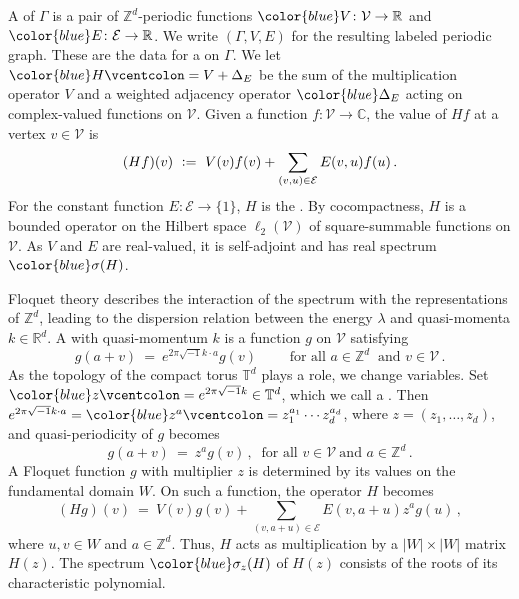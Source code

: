 \documentclass[12pt]{amsart}
\theoremstyle{remark}
\newcommand{\CC}{{\mathbb C}}
\newcommand{\RR}{{\mathbb R}}
\newcommand{\TT}{{\mathbb T}}
\newcommand{\ZZ}{{\mathbb Z}}
\newcommand{\calE}{{\mathcal E}}
\newcommand{\calV}{{\mathcal V}}
\newcommand{\defcolor}[1]{{\color{blue}#1}}
\newcommand{\demph}[1]{\defcolor{{\sl #1}}}
\begin{document}
A \demph{labeling} of $\Gamma$ is a pair of  $\ZZ^d$-periodic functions
$\defcolor{V}\colon \calV \to \RR$ and $\defcolor{E}\colon \calE \to \RR$.
We write $(\Gamma,V,E)$ for the resulting labeled periodic graph.
These are the data for a \demph{discrete periodic operator} on $\Gamma$.
We let $\defcolor{H}\vcentcolon= V+\Delta_E$ be the sum of the multiplication operator $V$ and a 
weighted adjacency operator $\defcolor{\Delta_E}$  acting on complex-valued functions on $\calV$.
Given a function $f\colon \calV\to \CC$, the value of $Hf$ at a vertex $v\in\calV$ is
%
 \begin{equation}\label{eq1}
     (Hf)(v)\ \vcentcolon=\ V(v) f(v) + \sum_{(v,u) \in \calE} E(v,u)f(u)\,.
 \end{equation}
%
For the constant function $E\colon \calE \to \{1\}$, $H$ is the
\demph{discrete periodic Schr\"odinger operator}.
By cocompactness, $H$ is a bounded operator on the Hilbert space $\ell_2(\calV)$ of square-summable functions on
$\calV$.
As $V$ and $E$ are real-valued, it is self-adjoint and has real spectrum $\defcolor{\sigma(H)}$.

Floquet theory describes the interaction of the spectrum with the representations of $\ZZ^d$,
leading to the dispersion relation between the energy $\lambda$ and quasi-momenta $k\in\RR^d$.
A \demph{Floquet function}  with quasi-momentum $k$ is a function $g$ on $\calV$ satisfying
\[
g(a{+}v)\ =\ e^{2\pi\sqrt{-1} k\cdot a}g(v) \qquad\mbox{ for all } a\in\ZZ^d\ \mbox{ and }v\in\calV\,.
\]
As the topology of the compact torus $\TT^d$ plays a role, we change variables.
Set $\defcolor{z}\vcentcolon= e^{2\pi\sqrt{-1} k}\in\TT^d$, which we call a  \demph{Floquet multiplier}.
Then $e^{2\pi\sqrt{-1} k\cdot a} = \defcolor{z^a} \vcentcolon= z_1^{a_1}\dotsb z_d^{a_d}$,
where $z=(z_1,\dotsc,z_d)$, and  quasi-periodicity of $g$ becomes
%
\begin{equation}\label{eq2}
    g(a{+}v)\ =\ z^a  g(v)\,,\ \text{ for all } v \in \calV\  \text{and } a\in \ZZ^d\,.
\end{equation}
%
A Floquet function $g$ with multiplier $z$ is determined by its values on the fundamental domain $W$.
On such a function, the operator $H$ becomes
%
\begin{equation}\label{eq3}
     (Hg)(v)\ =\  V(v) g(v) + \sum_{(v,a+u) \in \calE} E(v,a{+}u)  z^ag(u)\,,
\end{equation} 
%
where $u,v \in W$ and $a \in \ZZ^d$.
Thus, $H$ acts as multiplication by a $|W| \times |W|$ matrix $H(z)$.
The spectrum $\defcolor{\sigma_z(H)}$ of $H(z)$ consists of the roots of its characteristic polynomial.
\end{document}
